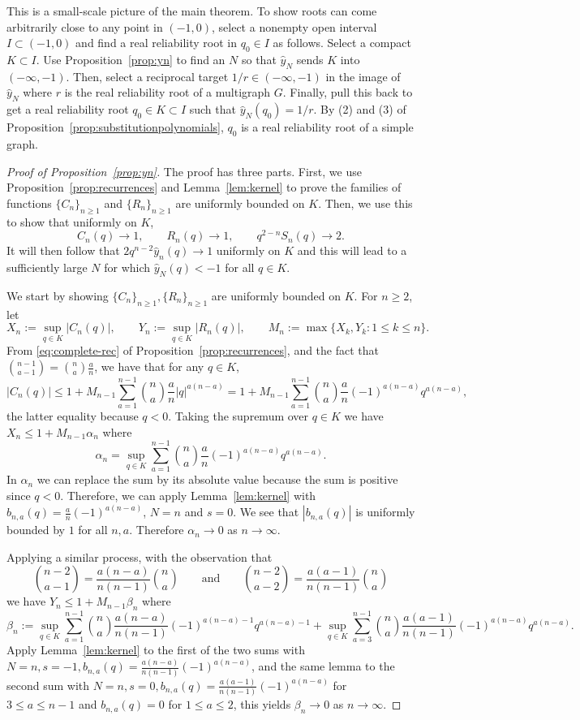 \documentclass[12pt]{amsart}
\theoremstyle{definition}
\begin{document}
This is a small-scale picture of the main theorem. To show roots can come arbitrarily close to any point in $(-1,0)$, select a nonempty open interval $I \subset (-1,0)$ and find a real reliability root in $q_0 \in I$ as follows. Select a compact $K \subset I$. Use Proposition~\ref{prop:yn} to find an $N$ so that $\hat{y}_N$ sends $K$ into $(-\infty,-1)$. Then, select a reciprocal target $1/r \in (-\infty,-1)$ in the image of $\hat{y}_N$ where $r$ is the real reliability root of a multigraph $G$. Finally, pull this back to get a real reliability root $q_0 \in K \subset I$ such that $\hat{y}_N(q_0)=1/r$. By (2) and (3) of Proposition~\ref{prop:substitutionpolynomials}, $q_0$ is a real reliability root of a simple graph.

\begin{proof}[Proof of Proposition~\ref{prop:yn}]
The proof has three parts. First, we use Proposition~\ref{prop:recurrences} and Lemma~\ref{lem:kernel} to prove the families of functions $\{C_n\}_{n \geq 1}$ and $\{R_n\}_{n \geq 1}$ are uniformly bounded on $K$. Then, we use this to show that uniformly on $K$, 
\[
C_n(q) \to 1, \qquad R_n(q) \to 1, \qquad q^{2-n}S_n(q) \to 2.
\]
It will then follow that $2q^{n-2}\hat{y}_n(q) \to 1$ uniformly on $K$ and this will lead to a sufficiently large $N$ for which $\hat{y}_N(q)<-1$ for all $q \in K$.

We start by showing $\{C_n\}_{n \geq 1},\{R_n\}_{n \geq 1}$ are uniformly bounded on $K$. For $n \geq 2$, let
\[
X_n:=\sup_{q \in K} |C_n(q)|, \qquad Y_n:=\sup_{q \in K} |R_n(q)|, \qquad M_n:=\max\{X_k,Y_k \colon 1 \leq k \leq n\}.
\]
From \eqref{eq:complete-rec} of Proposition~\ref{prop:recurrences}, and the fact that $\binom{n-1}{a-1}=\binom{n}{a}\frac{a}{n}$, we have that for any $q \in K$,
\[
|C_n(q)| \leq 1 + M_{n-1} \sum_{a=1}^{n-1} \binom{n}{a} \frac{a}{n} |q|^{a(n-a)}=1+M_{n-1}\sum_{a=1}^{n-1} \binom{n}{a} \frac{a}{n} (-1)^{a(n-a)} q^{a(n-a)},
\]
the latter equality because $q<0$. Taking the supremum over $q \in K$ we have $X_n \leq 1+M_{n-1}\alpha_n$ where 
\[
\alpha_n=\sup_{q \in K} \sum_{a=1}^{n-1} \binom{n}{a} \frac{a}{n} (-1)^{a(n-a)} q^{a(n-a)}.
\] 
In $\alpha_n$ we can replace the sum by its absolute value because the sum is positive since $q<0$. Therefore, we can apply  Lemma~\ref{lem:kernel} with $b_{n,a}(q)=\frac{a}{n}(-1)^{a(n-a)}$, $N=n$ and $s=0$. We see that $|b_{n,a}(q)|$ is uniformly bounded by $1$ for all $n,a$. Therefore $\alpha_n \to 0$ as $n \to \infty$.

Applying a similar process, with the observation that 
\[
\binom{n-2}{a-1}=\frac{a(n-a)}{n(n-1)}\binom{n}{a} \qquad{ \text{and} } \qquad \binom{n-2}{a-2}=\frac{a(a-1)}{n(n-1)}\binom{n}{a}
\]
we have $Y_n \leq 1+M_{n-1}\beta_n$ where
\[
\beta_n := \sup_{q \in K} \sum_{a=1}^{n-1} \binom{n}{a}\frac{a(n-a)}{n(n-1)}(-1)^{a(n-a)-1} q^{a(n-a)-1} + \sup_{q \in K} \sum_{a=3}^{n-1} \binom{n}{a}\frac{a(a-1)}{n(n-1)}(-1)^{a(n-a)} q^{a(n-a)}. 
\]
Apply Lemma~\ref{lem:kernel} to the first of the two sums with $N=n,s=-1,b_{n,a}(q)=\frac{a(n-a)}{n(n-1)}(-1)^{a(n-a)}$, and the same lemma to the second sum with $N=n,s=0,b_{n,a}(q)=\frac{a(a-1)}{n(n-1)}(-1)^{a(n-a)}$ for $3 \leq a \leq n-1$ and $b_{n,a}(q)=0$ for $1 \leq a \leq 2$, this yields $\beta_n \to 0$ as $n \to \infty$.


\end{proof}
\end{document}
